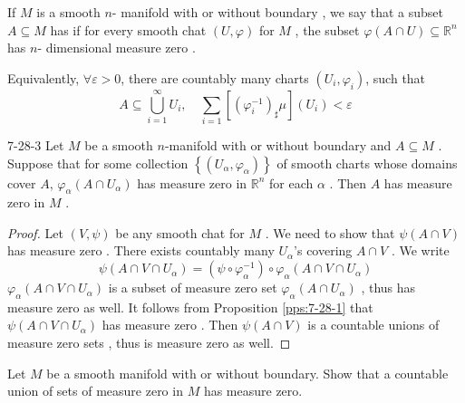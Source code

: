 \documentclass[../main.tex]{subfiles}
\begin{document}
\begin{definition}{}{}
    If  \(  M  \) is a smooth \(  n  \)- manifold with or without boundary , we say that a subset \(  A\subseteq M  \) has  if for every smooth chat \(  \left( U, \varphi  \right)   \) for \(  M  \) , the subset \(   \varphi \left( A\cap U \right)\subseteq \mathbb{R} ^{n}   \) has \(  n  \)- dimensional measure zero .        
\end{definition}
\begin{remark}
    Equivalently, \(  \forall  \varepsilon > 0  \), there are countably many charts \(  \left( U_{i}, \varphi _{i} \right)   \), such that \[
    A\subseteq \bigcup _{i= 1}^{\infty}U_{i},\quad \sum _{i= 1}\left[ \left(  \varphi _{i}^{-1}  \right)_{\sharp }\mu   \right](U_{i}) <  \varepsilon 
    \]  
\end{remark}
\begin{lemma}{}{7-28-3}
    Let \(  M  \) be a smooth \(  n  \)-manifold with or without boundary and \(  A\subseteq M  \) . Suppose that for some collection \(  \left\{ \left( U_{\alpha }, \varphi _{\alpha } \right)  \right\}  \) of smooth charts whose domains cover \(  A  \), \(   \varphi _{\alpha }\left( A\cap U_{\alpha } \right)   \) has measure zero in \(  \mathbb{R} ^{n}  \) for each \(  \alpha   \) . Then \(  A  \) has measure zero in \(  M  \) .           
\end{lemma}
\begin{proof}
    Let \(  \left( V,\psi  \right)   \) be any smooth chat for \(  M  \) . We need to show that \(   \psi  \left( A\cap V \right)   \) has measure zero . There exists countably many \(  U_{\alpha }  \)'s covering \(  A\cap V  \) . We write \[
    \psi \left( A\cap V \cap U_{\alpha }\right) = \left( \psi \circ  \varphi _{\alpha }^{-1}  \right)\circ  \varphi _{\alpha }\left( A\cap V\cap U_{\alpha } \right)  
    \]  \(   \varphi _{\alpha }\left( A\cap V\cap U_{\alpha } \right)   \) is a subset of measure zero set \(   \varphi _{\alpha }\left( A\cap U_{\alpha } \right)   \) , thus has measure zero as well. It follows from Proposition \ref{pps:7-28-1} that \(  \psi \left( A\cap V\cap U_{\alpha } \right)   \) has measure zero . Then \(  \psi \left( A\cap V \right)   \) is a countable unions of measure zero sets , thus is measure zero as well.   
\end{proof}


\begin{exercise}{}{}
    Let \(  M  \) be a smooth manifold with or without boundary. Show that a countable union of sets of measure zero in \(  M  \) has measure zero.   
\end{exercise}
\end{document}
